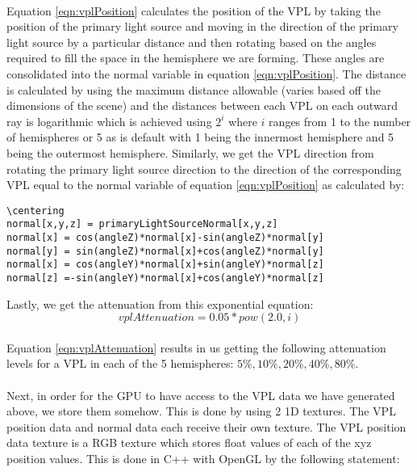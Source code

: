 \paragraph{}
Equation \ref{eqn:vplPosition} calculates the position of the VPL by taking the position of the primary light source and moving in the direction of the primary light source by a particular distance and then rotating based on the angles required to fill the space in the hemisphere we are forming.  These angles are consolidated into the normal variable in equation \ref{eqn:vplPosition}.  The distance is calculated by using the maximum distance allowable (varies based off the dimensions of the scene) and the distances between each VPL on each outward ray is logarithmic which is achieved using $2^i$ where $i$ ranges from 1 to the number of hemispheres or 5 as is default with 1 being the innermost hemisphere and 5 being the outermost hemisphere.  Similarly, we get the VPL direction from rotating the primary light source direction to the direction of the corresponding VPL equal to the normal variable of equation \ref{eqn:vplPosition} as calculated by:

\begin{lstlisting}
\centering
normal[x,y,z] = primaryLightSourceNormal[x,y,z]
normal[x] = cos(angleZ)*normal[x]-sin(angleZ)*normal[y]
normal[y] = sin(angleZ)*normal[x]+cos(angleZ)*normal[y]
normal[x] = cos(angleY)*normal[x]+sin(angleY)*normal[z]
normal[z] =-sin(angleY)*normal[x]+cos(angleY)*normal[z]
\end{lstlisting}

Lastly, we get the attenuation from this exponential equation:
\begin{equation}
vplAttenuation = 0.05*pow(2.0,i)\label{eqn:vplAttenuation}
\end{equation}

\paragraph{}
Equation \ref{eqn:vplAttenuation} results in us getting the following attenuation levels for a VPL in each of the 5 hemispheres: $5\%, 10\%, 20\%, 40\%, 80\%$.  

\paragraph{}
Next, in order for the GPU to have access to the VPL data we have generated above, we store them somehow.  This is done by using 2 1D textures.  The VPL position data and normal data each receive their own texture.  The VPL position data texture is a RGB texture which stores float values of each of the xyz position values.  This is done in C++ with OpenGL by the following statement:

